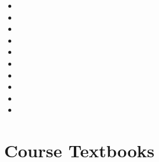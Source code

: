 \begin{itemize}
    \item \CSPBDataStructSyllabus
    \item \CSPBCompSysSyllabus
    \item \CSPBLASyllabus
    \item \CSPBDiscreteSyllabus
    \item \CSPBDataSciSyllabus
    \item \CSPBAlgoSyllabus
    \item \CSPBPPLSyllabus
    \item \CSPBAISyllabus
    \item \CSPBSoftDevSyllabus
    \item \CSPBCogSciSyllabus
\end{itemize}

\renewcommand{\SectionTitle}{Course Textbooks}

\section{\SectionTitle}

